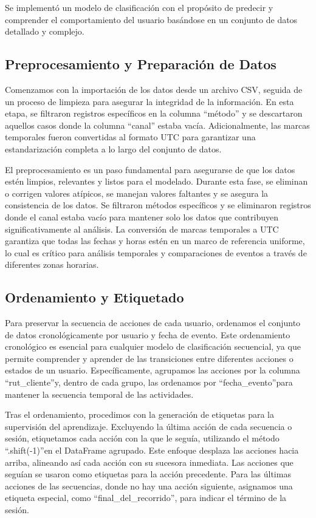 Se implementó un modelo de clasificación con el propósito de predecir y comprender el comportamiento del usuario basándose en un conjunto de datos detallado y complejo.

\subsection{Preprocesamiento y Preparación de Datos}

Comenzamos con la importación de los datos desde un archivo CSV, seguida de un proceso de limpieza para asegurar la integridad de la información. En esta etapa, se filtraron registros específicos en la columna “método” y se descartaron aquellos casos donde la columna “canal” estaba vacía. Adicionalmente, las marcas temporales fueron convertidas al formato UTC para garantizar una estandarización completa a lo largo del conjunto de datos.

El preprocesamiento es un paso fundamental para asegurarse de que los datos estén limpios, relevantes y listos para el modelado. Durante esta fase, se eliminan o corrigen valores atípicos, se manejan valores faltantes y se asegura la consistencia de los datos. Se filtraron métodos específicos y se eliminaron registros donde el canal estaba vacío para mantener solo los datos que contribuyen significativamente al análisis. La conversión de marcas temporales a UTC garantiza que todas las fechas y horas estén en un marco de referencia uniforme, lo cual es crítico para análisis temporales y comparaciones de eventos a través de diferentes zonas horarias.

\subsection{Ordenamiento y Etiquetado}

Para preservar la secuencia de acciones de cada usuario, ordenamos el conjunto de datos cronológicamente por usuario y fecha de evento. Este ordenamiento cronológico es esencial para cualquier modelo de clasificación secuencial, ya que permite comprender y aprender de las transiciones entre diferentes acciones o estados de un usuario. Específicamente, agrupamos las acciones por la columna \textquotedblleft rut\_cliente\textquotedblright y, dentro de cada grupo, las ordenamos por \textquotedblleft fecha\_evento\textquotedblright para mantener la secuencia temporal de las actividades.

Tras el ordenamiento, procedimos con la generación de etiquetas para la supervisión del aprendizaje. Excluyendo la última acción de cada secuencia o sesión, etiquetamos cada acción con la que le seguía, utilizando el método \textquotedblleft .shift(-1)\textquotedblright en el DataFrame agrupado. Este enfoque desplaza las acciones hacia arriba, alineando así cada acción con su sucesora inmediata. Las acciones que seguían se usaron como etiquetas para la acción precedente. Para las últimas acciones de las secuencias, donde no hay una acción siguiente, asignamos una etiqueta especial, como \textquotedblleft final\_del\_recorrido\textquotedblright, para indicar el término de la sesión.

